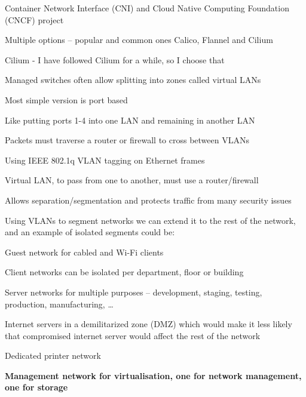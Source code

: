 \documentclass[Screen16to9,17pt]{foils}
\begin{document}
\begin{list2}
\item Container Network Interface (CNI) and Cloud Native Computing Foundation (CNCF) project\\
\item Multiple options -- popular and common ones Calico, Flannel and Cilium
\item Cilium - I have followed Cilium for a while, so I choose that
\end{list2}




\begin{list1}
\item Managed switches often allow splitting into zones called virtual LANs
\item Most simple version is port based
\item Like putting ports 1-4 into one LAN and remaining in another LAN
\item Packets must traverse a router or firewall to cross between VLANs
\end{list1}



\begin{list1}
\item Using IEEE 802.1q  VLAN tagging on Ethernet frames
\item Virtual LAN, to pass from one to another, must use a router/firewall
\item Allows separation/segmentation and protects traffic from many security issues
\end{list1}


Using VLANs to segment networks we can extend it to the rest of the network, and an example of isolated segments could be:
\begin{list2}
\item Guest network for cabled and Wi-Fi clients
\item Client networks can be isolated per department, floor or building
\item Server networks for multiple purposes – development, staging, testing, production, manufacturing, …
\item Internet servers in a demilitarized zone (DMZ) which would make it less likely that compromised internet
server would affect the rest of the network
\item Dedicated printer network
\item \textbf{Management network for virtualisation, one for network management, one for storage}
\end{list2}
\end{document}

